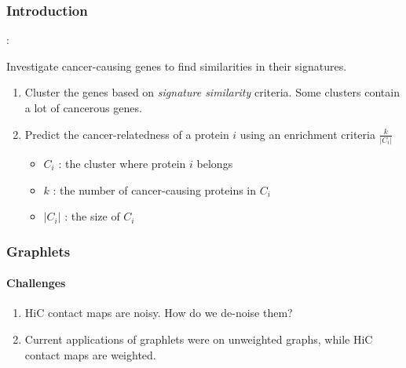 \documentclass{beamer}
\begin{document}
\begin{frame}
    \frametitle{Introduction}
    \textbf{}: 

    Investigate cancer-causing genes to find similarities in their signatures. 
    \begin{enumerate}
        \item Cluster the genes based on \textit{signature similarity} criteria.
            Some clusters contain a lot of cancerous genes.
        
        \item Predict the cancer-relatedness of a protein $i$ using
            an enrichment criteria $\frac{k}{|C_i|}$ \\
            \begin{itemize}
                \item $C_i$ : the cluster where protein $i$ belongs\\
                \item $k$ : the number of cancer-causing proteins in $C_i$ \\
                \item $|C_i|$ : the size of $C_i$
            \end{itemize}
    \end{enumerate}
\end{frame}
\begin{frame}
    \frametitle{Graphlets}
    \framesubtitle{Challenges}
    \begin{enumerate}
        \item HiC contact maps are noisy. How do we de-noise them?
        \item Current applications of graphlets were on unweighted
            graphs, while HiC contact maps are weighted.
    \end{enumerate}
\end{frame}
\end{document}

